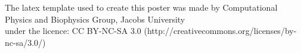 \documentclass[draft]{beamer}
\begin{document}
% 

\begin{frame}[t]

\begin{columns}[t] 
  
  \begin{column}{\sepwid}\end{column}
  
  
  \begin{column}{\oneprvni} 
    
  \end{column}


  \separacnisloupec


  \begin{column}{\twodruhy} 
    
  \end{column}

  \separacnisloupec

  \begin{column}{\threetreti} 
    
  \end{column}
  
  \begin{column}{\sepwid}\end{column}
  
  \end{columns}
  \hfill {\tiny The latex template used to create this poster was made by Computational Physics and Biophysics Group, Jacobs University\\[-18pt] \hfill under the licence: CC BY-NC-SA 3.0 (http://creativecommons.org/licenses/by-nc-sa/3.0/)}
  \end{frame} %
\end{document}

